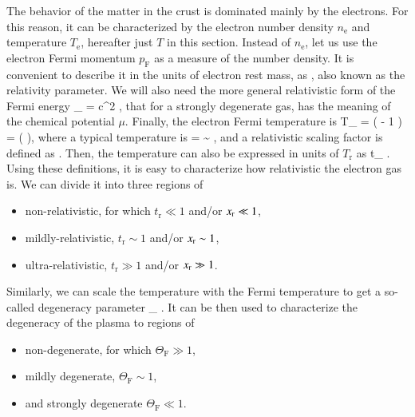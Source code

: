 The behavior of the matter in the crust is dominated mainly by the electrons. 
For this reason, it can be characterized by the electron number density $n_{\mathrm{e}}$ and temperature $T_{\mathrm{e}}$, hereafter just $T$ in this section.
Instead of $n_{\mathrm{e}}$, let us use the electron Fermi momentum $p_{\mathrm{F}}$  as a measure of the number density.
It is convenient to describe it in the units of electron rest mass, as
\be
\xr \equiv {},
\ee
also known as the relativity parameter.\cite{Salpeter61}
We will also need the more general relativistic form of the Fermi energy
\be
\epsilon_{} = c^2 ,
\ee
that for a strongly degenerate gas, has the meaning of the chemical potential $\mu$.
Finally, the electron Fermi temperature is
\be
T_{} =  \left(  - 1 \right)
= \Tr (  ),
\ee
where a typical temperature is
\be
\Tr =  \sim {} \Kelvin,
\ee
and a relativistic scaling factor is defined as
\be
\gammar \equiv {}.
\ee
Then, the temperature can also be expressed in units of $T_{\mathrm{r}}$ as 
\be
t_{} \equiv {}.
\ee
Using these definitions, it is easy to characterize how relativistic the electron gas is.
We can divide it into three regions of 
\begin{itemize}
    \item non-relativistic, for which $t_{\mathrm{r}} \ll 1 $ and/or $x_{\mathrm{r}} \ll 1$, 
    \item mildly-relativistic, $t_{\mathrm{r}} \sim 1$ and/or $x_{\mathrm{r}} \sim 1$,
    \item ultra-relativistic, $t_{\mathrm{r}} \gg 1$ and/or $x_{\mathrm{r}} \gg 1$.
\end{itemize}

Similarly, we can scale the temperature with the Fermi temperature to get a so-called degeneracy parameter
\be\label{eq:Thetar}
\Theta_{} \equiv {}.
\ee
It can be then used to characterize the degeneracy of the plasma to regions of 
\begin{itemize}
    \item non-degenerate, for which $\Theta_{\mathrm{F}} \gg 1$,
    \item mildly degenerate, $\Theta_{\mathrm{F}} \sim 1$,
    \item and strongly degenerate $\Theta_{\mathrm{F}} \ll 1$.
\end{itemize}


